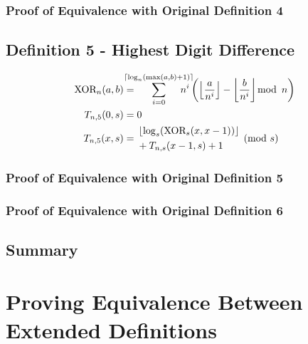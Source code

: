 \documentclass[conference]{IEEEtran}
\begin{document}

\subsubsection{Proof of Equivalence with Original Definition 4}

\subsection{Definition 5 - Highest Digit Difference}

\begin{equation}
    \begin{aligned}
\text{XOR}_{n}(a, b) &= \hspace{-13pt} \sum_{i=0}^{\ceil{\log_{n}(\max(a,b) + 1)}} \hspace{-15pt} n^i \left(\floor{\dfrac{a}{n^i}} - \floor{\dfrac{b}{n^i}} \mod{n}\right) \\
       T_{n,5}(0, s) &= 0 \\
       T_{n,5}(x, s) &= \begin{aligned}[c]
           &\floor{\log_s(\text{XOR}_{s}(x, x - 1))} \\
           &+ T_{n,s}(x - 1, s) + 1
       \end{aligned} \pmod{s}
    \end{aligned}
\end{equation}


\subsubsection{Proof of Equivalence with Original Definition 5}


\subsubsection{Proof of Equivalence with Original Definition 6}

\subsection{Summary}

\section{Proving Equivalence Between Extended Definitions}
\end{document}
